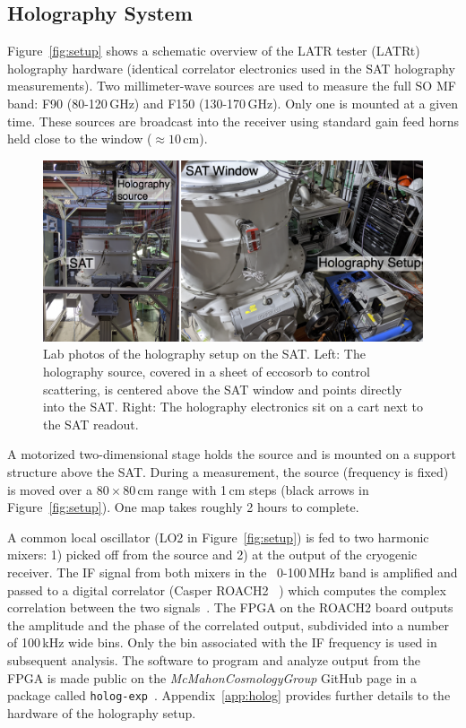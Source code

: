 \subsection{Holography System}
\label{sec:sat_meas_hardware}

Figure~\ref{fig:setup} shows a schematic overview of the LATR tester (LATRt) holography hardware (identical correlator electronics used in the SAT holography measurements).  Two millimeter-wave sources are used to measure the full SO MF band: F90 (80-120\,GHz) and F150 (130-170\,GHz).  Only one is mounted at a given time.  These sources are broadcast into the receiver using standard gain feed horns held close to the window ($\approx10$\,cm).

\begin{figure}[t!]
    \centering
    \includegraphics[width = \textwidth]{Figures/sat_exp.png}
    \caption{Lab photos of the holography setup on the SAT.  Left: The holography source, covered in a sheet of eccosorb to control scattering, is centered above the SAT window and points directly into the SAT.  Right:  The holography electronics sit on a cart next to the SAT readout.}
    \label{fig:sat_hardware}
\end{figure}

A motorized two-dimensional stage holds the source and is mounted on a support structure above the SAT.  During a measurement, the source (frequency is fixed) is moved over a $80\times80$\,cm range with 1\,cm steps (black arrows in Figure~\ref{fig:setup}).  One map takes roughly 2 hours to complete.

A common local oscillator (LO2 in Figure~\ref{fig:setup}) is fed to two harmonic mixers: 1) picked off from the source and 2) at the output of the cryogenic receiver.  The IF signal from both mixers in the ~0-100\,MHz band is amplified and passed to a digital correlator (Casper ROACH2 ~\cite{roach2}) which computes the complex correlation between the two signals~\cite{ches18}.  The FPGA on the ROACH2 board outputs the amplitude and the phase of the correlated output, subdivided into a number of 100\,kHz wide bins.  Only the bin associated with the IF frequency is used in subsequent analysis.  The software to program and analyze output from the FPGA is made public on the \textit{McMahonCosmologyGroup} GitHub page in a package called \verb|holog-exp|~\cite{holog-exp}.  Appendix~\ref{app:holog} provides further details to the hardware of the holography setup.

